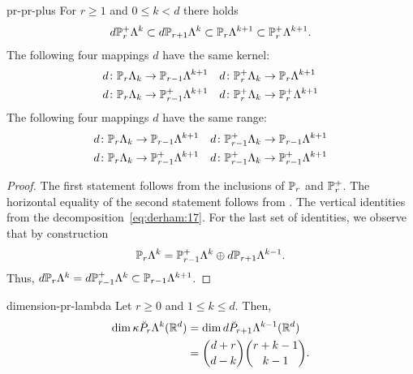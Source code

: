 \begin{Lemma}{pr-pr-plus}
  For $r\ge 1$ and $0\le k < d$ there holds
  \begin{gather}
    d\P_{r}^+\Lambda^k \subset d\P_{r+1}\Lambda^k
    \subset \P_r\Lambda^{k+1}
    \subset \P_r^+\Lambda^{k+1}.
  \end{gather}
  The following four mappings $d$ have the same kernel:
  \begin{gather}
    \begin{aligned}
      d\colon \P_r\Lambda_k &\to \P_{r-1}\Lambda^{k+1}
      &
      d\colon \P_r^+\Lambda_k &\to \P_{r}\Lambda^{k+1}
      \\
      d\colon \P_r\Lambda_k &\to \P_{r-1}^+\Lambda^{k+1}
      &
      d\colon \P_r^+\Lambda_k &\to \P_{r}^+\Lambda^{k+1}
    \end{aligned}
  \end{gather}
  The following four mappings $d$ have the same range:
  \begin{gather}
    \begin{aligned}
      d\colon \P_r\Lambda_k &\to \P_{r-1}\Lambda^{k+1}
      &
      d\colon \P_{r-1}^+\Lambda_k &\to \P_{r-1}\Lambda^{k+1}
      \\
      d\colon \P_r\Lambda_k &\to \P_{r-1}^+\Lambda^{k+1}
      &
      d\colon \P_{r-1}^+\Lambda_k &\to \P_{r-1}^+\Lambda^{k+1}
    \end{aligned}
  \end{gather}
\end{Lemma}

\begin{proof}
  The first statement follows from the inclusions of $\P_r$ and
  $\P_r^+$. The horizontal equality of the second statement follows
  from . The vertical identities from the
  decomposition~\eqref{eq:derham:17}. For the last set of identities,
  we observe that by construction
  \begin{gather*}
    \P_r\Lambda^k = \P_{r-1}^+\Lambda^k \oplus d \P_{r+1}\Lambda^{k-1}.
  \end{gather*}
  Thus, $d\P_r\Lambda^k = d\P_{r-1}^+\Lambda^k\subset \P_{r-1}\Lambda^{k+1}$.
\end{proof}

\begin{Theorem}{dimension-pr-lambda}
  Let $r\ge 0$ and $1\le k \le d$. Then,
  \begin{gather}
    \begin{split}
      \dim \kappa \breve P_r\Lambda^k(\R^d)
      & = \dim d \breve P_{r+1}\Lambda^{k-1}(\R^d)
      \\
      &= \binom{d+r}{d-k}\binom{r+k-1}{k-1}.
    \end{split}
  \end{gather}
\end{Theorem}

